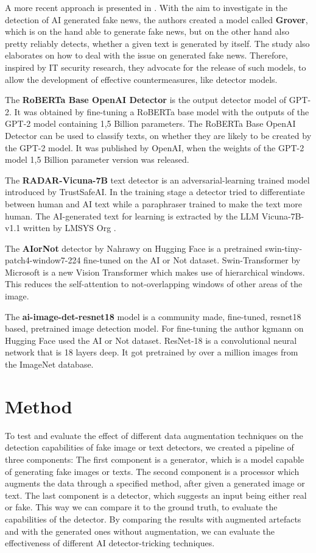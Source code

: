 \documentclass{article} %
\begin{document}
A more recent approach is presented in \cite{zellers2020defending}. With the aim to investigate in the detection of AI generated fake news,  the authors created a model called \textbf{Grover}, which is on the hand able to generate fake news, but on the other hand also pretty reliably detects, whether a given text is generated by itself. The study also elaborates on how to deal with the issue on generated fake news. Therefore, inspired by IT security research, they advocate for the release of such models, to allow the development of effective countermeasures, like detector models.

The \textbf{RoBERTa Base OpenAI Detector} is the output detector model of GPT-2. It was obtained by fine-tuning a RoBERTa base model with the outputs of the GPT-2 model containing 1,5 Billion parameters. The RoBERTa Base OpenAI Detector can be used to classify texts, on whether they are likely to be created by the GPT-2 model. It was published by OpenAI, when the weights of the GPT-2 model 1,5 Billion parameter version was released.

The \textbf{RADAR-Vicuna-7B} text detector is an adversarial-learning trained model introduced by TrustSafeAI. In the training stage a detector tried to differentiate between human and AI text while a paraphraser trained to make the text more human. The AI-generated text for learning is extracted by the LLM Vicuna-7B-v1.1 written by LMSYS Org \cite{hu2023radar}.

The \textbf{AIorNot} detector by Nahrawy on Hugging Face is a pretrained swin-tiny-patch4-window7-224 fine-tuned on the AI or Not dataset. Swin-Transformer by Microsoft is a new Vision Transformer which makes use of hierarchical windows. This reduces the self-attention to not-overlapping windows of other areas of the image. \cite{liu2021swin}

The \textbf{ai-image-det-resnet18} model is a community made, fine-tuned, resnet18 based, pretrained image detection model. For fine-tuning the author kgmann on Hugging Face used the AI or Not dataset. ResNet-18 is a convolutional neural network that is 18 layers deep. It got pretrained by over a million images from the ImageNet database. \cite{he2015deep}


\section{Method}
To test and evaluate the effect of different data augmentation techniques on the detection capabilities of fake image or text detectors, we created a pipeline of three components: The first component is a generator, which is a model capable of generating fake images or texts. The second component is a processor which augments the data through a specified method, after given a generated image or text. The last component is a detector, which suggests an input being either real or fake. This way we can compare it to the ground truth, to evaluate the capabilities of the detector. By comparing the results with augmented artefacts and with the generated ones without augmentation, we can evaluate the effectiveness of different AI detector-tricking techniques.
\end{document}
